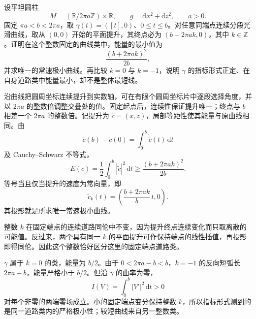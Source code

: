 \begin{exercise}\label{g3:ex:cylinder-energy-winding-class}
	设平坦圆柱
	\[
		M=(\mathbb R/2\pi a\mathbb Z)\times\mathbb R,\qquad
		g=\mathrm dx^2+\mathrm dz^2,\qquad a>0.
	\]
	固定 \(\pi a<b<2\pi a\)，取 \(\gamma(t)=([t],0)\)、\(0\le t\le b\)。对任意同端点连续分段光滑曲线，取从 \((0,0)\) 开始的平面提升，其终点必为 \((b+2\pi ak,0)\)，其中 \(k\in\mathbb Z\)。证明在这个整数固定的曲线类中，能量的最小值为
	\[
		\frac{(b+2\pi ak)^2}{2b},
	\]
	并求唯一的常速极小曲线。再比较 \(k=0\) 与 \(k=-1\)，说明 \(\gamma\) 的指标形式正定、在自身道路类中能量最小，却不是整体最短线。
\end{exercise}
\begin{solution}
	沿曲线把圆周坐标连续提升到实数轴，可在有限个圆周坐标片中逐段选择角度，并以 \(2\pi a\) 的整数倍调整交叠处的值。固定起点后，连续性保证提升唯一；终点与 \(b\) 相差一个 \(2\pi a\) 的整数倍。记提升为 \(\widetilde c=(x,z)\)，局部等距性使其能量与原曲线相同。由
	\[
		\widetilde c(b)-\widetilde c(0)
		=\int_0^b\dot{\widetilde c}(t)\,\mathrm dt
	\]
	及 Cauchy--Schwarz 不等式，
	\[
		E(c)=\frac12\int_0^b|\dot{\widetilde c}|^2\,\mathrm dt
		\ge\frac{(b+2\pi ak)^2}{2b}.
	\]
	等号当且仅当提升的速度为常向量，即
	\[
		\widetilde c_k(t)=
		\left(\frac{b+2\pi ak}{b}\,t,0\right).
	\]
	其投影就是所求唯一常速极小曲线。

	整数 \(k\) 在固定端点的连续道路同伦中不变，因为提升终点连续变化而只取离散的可能值。反过来，两个具有同一 \(k\) 的平面提升可作保持端点的线性插值，再投影即得同伦。因此这个整数恰好区分这里的固定端点道路类。

	\(\gamma\) 属于 \(k=0\) 的类，能量为 \(b/2\)。由于 \(0<2\pi a-b<b\)，\(k=-1\) 的反向短弧长 \(2\pi a-b\)，能量严格小于 \(b/2\)。但沿 \(\gamma\) 的曲率为零，
	\[
		I(V)=\int_0^b|V'|^2\,\mathrm dt>0
	\]
	对每个非零的两端零场成立。小的固定端点变分保持整数 \(k\)，所以指标形式测到的是同一道路类内的严格极小性；较短曲线来自另一整数类。
\end{solution}


